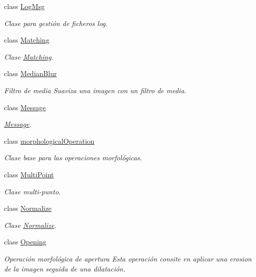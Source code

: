 \begin{DoxyCompactItemize}
class \hyperlink{class_i3_d_1_1_log_msg}{Log\+Msg}
\begin{DoxyCompactList}\small\item\em Clase para gestión de ficheros log. \end{DoxyCompactList}\item 
class \hyperlink{class_i3_d_1_1_matching}{Matching}
\begin{DoxyCompactList}\small\item\em Clase \hyperlink{class_i3_d_1_1_matching}{Matching}. \end{DoxyCompactList}\item 
class \hyperlink{class_i3_d_1_1_median_blur}{Median\+Blur}
\begin{DoxyCompactList}\small\item\em Filtro de media Suaviza una imagen con un filtro de media. \end{DoxyCompactList}\item 
class \hyperlink{class_i3_d_1_1_message}{Message}
\begin{DoxyCompactList}\small\item\em \hyperlink{class_i3_d_1_1_message}{Message}. \end{DoxyCompactList}\item 
class \hyperlink{class_i3_d_1_1morphological_operation}{morphological\+Operation}
\begin{DoxyCompactList}\small\item\em Clase base para las operaciones morfológicas. \end{DoxyCompactList}\item 
class \hyperlink{class_i3_d_1_1_multi_point}{Multi\+Point}
\begin{DoxyCompactList}\small\item\em Clase multi-\/punto. \end{DoxyCompactList}\item 
class \hyperlink{class_i3_d_1_1_normalize}{Normalize}
\begin{DoxyCompactList}\small\item\em Clase \hyperlink{class_i3_d_1_1_normalize}{Normalize}. \end{DoxyCompactList}\item 
class \hyperlink{class_i3_d_1_1_opening}{Opening}
\begin{DoxyCompactList}\small\item\em Operación morfológica de apertura Esta operación consite en aplicar una erosion de la imagen seguida de una dilatación. \end{DoxyCompactList}\item 

\end{DoxyCompactItemize}

